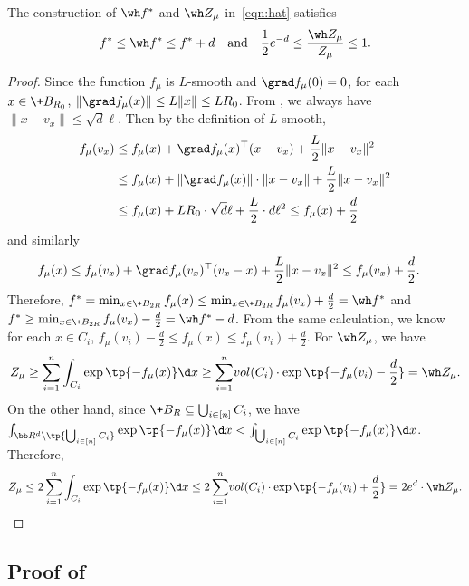  \begin{lemma}\label{lem:estimate}
     The construction of $\wh f^*$ and $\wh Z_{\mu}$ in~\eqref{eqn:hat} satisfies
     \[
    f^* \leq \wh f^* \leq f^* + d \quad \mbox{and}\quad 
    \frac12 e^{-d}\le \frac{\wh Z_{\mu}}{Z_{\mu}} \le 1.
    \]
 \end{lemma}
 \begin{proof}
    Since the function $f_\mu$ is $L$-smooth and $\grad f_\mu(0)=0$, for each $x\in \+B_{R_0}$, $\|\grad f_\mu(x)\|\leq L\|x\| \leq LR_0$. From , we always have $\|x - v_x\| \leq \sqrt{d}\ell$. Then by the definition of $L$-smooth,
    \begin{align*}
        f_\mu(v_x) &\leq f_\mu(x) + \grad f_\mu(x)^{\top} (x-v_x) + \frac{L}{2} \|x - v_x\|^2\\
        & \leq f_\mu(x) + \|\grad f_\mu(x)\| \cdot \|x-v_x\| + \frac{L}{2} \|x - v_x\|^2 \\
        &\leq f_\mu(x) + LR_0\cdot \sqrt{d}\ell + \frac{L}{2}\cdot d\ell^2 \leq f_\mu(x) + \frac{d}{2}
    \end{align*}
    and similarly
    \begin{align*}
        f_\mu(x) & \leq f_\mu(v_x) + \grad f_\mu(v_x)^{\top} (v_x - x) + \frac{L}{2} \|x - v_x\|^2 \leq f_\mu(v_x) + \frac{d}{2}.
    \end{align*}
    Therefore, $f^* = \min_{x\in \+B_{2R}} f_\mu(x) \leq \min_{x\in \+B_{2R}} f_\mu(v_x) + \frac{d}{2} = \wh f^*$ and $f^* \geq \min_{x\in \+B_{2R}} f_\mu(v_x) - \frac{d}{2} = \wh f^* - d$.  From the same calculation, we know for each $x\in C_i$, $f_\mu(v_i) - \frac{d}{2} \leq f_\mu(x)\leq f_\mu(v_i) + \frac{d}{2}$. For $\wh Z_{\mu}$, we have
    \[
        Z_{\mu} \geq \sum_{i=1}^n \int_{C_i} \exp\tp{-f_\mu(x)} \d x \geq \sum_{i=1}^n \!{vol}(C_i)\cdot \exp\tp{-f_\mu(v_i) - \frac{d}{2}} = \wh Z_{\mu}.
    \]
    On the other hand, since $\+B_R\subseteq \bigcup_{i\in[n]} C_i$, we have $\int_{\bb R^d \setminus \tp{\bigcup_{i\in[n]} C_i}} \exp\tp{-f_\mu(x)} \d x < \int_{\bigcup_{i\in[n]} C_i} \exp\tp{-f_\mu(x)} \d x$. Therefore,
    \[
        Z_{\mu}\leq 2\sum_{i=1}^n \int_{C_i} \exp\tp{-f_\mu(x)} \d x \leq 2\sum_{i=1}^n \!{vol}(C_i)\cdot \exp\tp{-f_\mu(v_i) + \frac{d}{2}} = 2e^d\cdot \wh Z_{\mu}.
    \]
\end{proof}

\subsection{Proof of } \label{sec:proof-of-ub}

